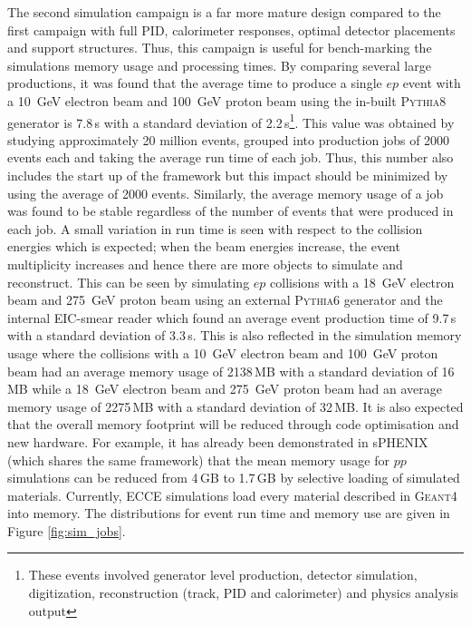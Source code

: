	The second simulation campaign is a far more mature design compared to the first campaign with full PID, calorimeter responses, optimal detector placements and support structures. Thus, this campaign is useful for bench-marking the simulations memory usage and processing times. By comparing several large productions, it was found that the average time to produce a single $ep$ event with a 10~GeV electron beam and 100~GeV proton beam using the in-built \textsc{Pythia8} generator is 7.8\,s with a standard deviation of 2.2\,s\footnote{These events involved generator level production, detector simulation, digitization, reconstruction (track, PID and calorimeter) and physics analysis output}. This value was obtained by studying approximately 20 million events, grouped into production jobs of 2000 events each and taking the average run time of each job. Thus, this number also includes the start up of the framework but this impact should be minimized by using the average of 2000 events. Similarly, the average memory usage of a job was found to be stable regardless of the number of events that were produced in each job. A small variation in run time is seen with respect to the collision energies which is expected; when the beam energies increase, the event multiplicity increases and hence there are more objects to simulate and reconstruct. This can be seen by simulating $ep$ collisions with a 18~GeV electron beam and 275~GeV proton beam using an external \textsc{Pythia6} generator and the internal EIC-smear reader which found an average event production time of 9.7\,s with a standard deviation of 3.3\,s. This is also reflected in the simulation memory usage where the collisions with a 10~GeV electron beam and 100~GeV proton beam had an average memory usage of 2138\,MB with a standard deviation of 16\,MB while a 18~GeV electron beam and 275~GeV proton beam had an average memory usage of 2275\,MB with a standard deviation of 32\,MB. It is also expected that the overall memory footprint will be reduced through code optimisation and new hardware. For example, it has already been demonstrated in sPHENIX (which shares the same framework) that the mean memory usage for $pp$ simulations can be reduced from 4\,GB to 1.7\,GB by selective loading of simulated materials. Currently, ECCE simulations load every material described in \textsc{Geant4} into memory. The distributions for event run time and memory use are given in Figure \ref{fig:sim_jobs}.
	
